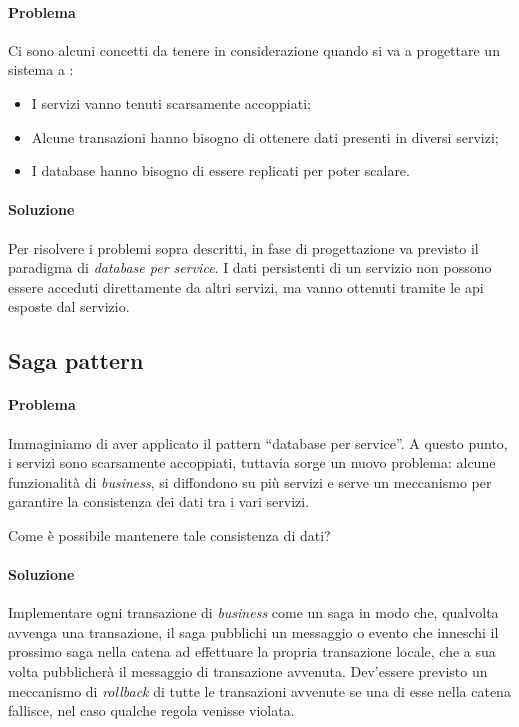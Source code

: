 \paragraph*{Problema} Ci sono alcuni concetti da tenere in considerazione quando si va a progettare un sistema a :
\begin{itemize}[noitemsep]
	\item I servizi vanno tenuti scarsamente accoppiati;
	\item Alcune transazioni hanno bisogno di ottenere dati presenti in diversi servizi;
	\item I database hanno bisogno di essere replicati per poter scalare.
\end{itemize}

\paragraph*{Soluzione} Per risolvere i problemi sopra descritti, in fase di progettazione va previsto il paradigma di \textit{database per service}.
I dati persistenti di un servizio non possono essere acceduti direttamente da altri servizi, ma vanno ottenuti tramite le \gls{api} esposte dal servizio.


\subsection{Saga pattern}

\paragraph*{Problema} Immaginiamo di aver applicato il pattern ``database per service''.
A questo punto, i servizi sono scarsamente accoppiati, tuttavia sorge un nuovo problema: alcune funzionalità di \textit{business}, si diffondono su più servizi e serve un meccanismo per garantire la consistenza dei dati
tra i vari servizi. 

Come è possibile mantenere tale consistenza di dati?

\paragraph*{Soluzione} Implementare ogni transazione di \textit{business} come un saga in modo che, qualvolta avvenga una transazione, il saga pubblichi un messaggio o evento che inneschi il prossimo saga nella catena ad effettuare la propria transazione locale, che a sua volta pubblicherà il messaggio di transazione avvenuta.
Dev'essere previsto un meccanismo di \textit{rollback} di tutte le transazioni avvenute se una di esse nella catena fallisce, nel caso qualche regola venisse violata.

